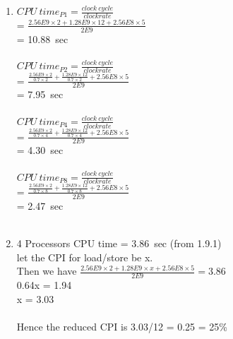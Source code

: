 \documentclass[]{article}
\begin{document}
\begin{enumerate}[(1)]
\item $CPU\ time_{P1} = \frac{clock\ cycle}{clock rate}$\\
\hspace*{14.2ex}= $\frac{2.56E9\times 2+1.28E9\times 12+2.56E8\times 5}{2E9}$\\
\hspace*{14.2ex}= 10.88\ sec\\\\
$CPU\ time_{P2} = \frac{clock\ cycle}{clock rate}$\\
\hspace*{14.2ex}= $\frac{\frac{2.56E9\times 2}{0.7\times 2}+\frac{1.28E9\times 12}{0.7\times 2}+2.56E8\times 5}{2E9}$\\
\hspace*{14.2ex}= 7.95\ sec\\\\
$CPU\ time_{P4} = \frac{clock\ cycle}{clock rate}$\\
\hspace*{14.2ex}= $\frac{\frac{2.56E9\times 2}{0.7\times 4}+\frac{1.28E9\times 12}{0.7\times 4}+2.56E8\times 5}{2E9}$\\
\hspace*{14.2ex}= 4.30\ sec\\\\
$CPU\ time_{P8} = \frac{clock\ cycle}{clock rate}$\\
\hspace*{14.2ex}= $\frac{\frac{2.56E9\times 2}{0.7\times 8}+\frac{1.28E9\times 12}{0.7\times 8}+2.56E8\times 5}{2E9}$\\
\hspace*{14.2ex}= 2.47\ sec\\\\

\item 4 Processors CPU time = 3.86\ sec (from 1.9.1)\\
let the CPI for load/store be x.\\
Then we have $\frac{2.56E9\times 2+1.28E9\times x+2.56E8\times 5}{2E9} = 3.86$\\
\hspace*{37.2ex}0.64x = 1.94\\
\hspace*{40.6ex} x = 3.03\\\\
Hence the reduced CPI is 3.03/12 = 0.25 = 25\%

\end{enumerate}
\newpage
\end{document}
